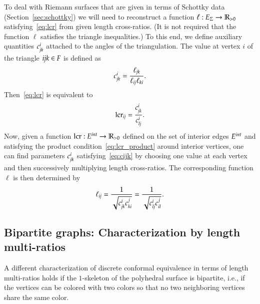 \documentclass[Thesis]{subfiles}
\begin{document}
To deal with Riemann surfaces that are given in terms of Schottky data
(Section~\ref{sec:schottky}) we will
need to reconstruct a function $\ell:E_{\Sigma}\rightarrow\mathbb R_{>0}$
satisfying~\eqref{eq:lcr} from given length cross-ratios. (It is not
required that the function $\ell$ satisfies the triangle inequalities.) To this end, we define
auxiliary quantities $c^{i}_{\it jk}$ attached to the angles of the
triangulation. The value at vertex $i$ of the triangle ${\it ijk}\in F$
is defined as
\begin{equation}
  \label{eq:cijk}
  c^{i}_{\it jk}=\frac{\ell_{\it jk}}{\ell_{\it ij}\ell_{\it ki}}.
\end{equation} 
Then~\eqref{eq:lcr} is equivalent to
\begin{equation}
\operatorname{lcr}_{\it ij}=\frac{c^i_{\it jk}}{c^i_{\it lj}}.
\end{equation}
Now, given a function $\operatorname{lcr}:E^{\mathit{int}}\rightarrow\mathbb R_{>0}$ defined on the
set of interior edges $E^{\mathit{int}}$ and satisfying the product
condition~\eqref{eq:lcr_product} around interior vertices, one can
find parameters $c^{i}_{\it jk}$ satisfying~\eqref{eq:cijk}
by choosing one value at each vertex and then successively multiplying
length cross-ratios. The corresponding function $\ell$ is then
determined by
\begin{equation}
\ell_{\it ij} = \frac{1}{\sqrt{c^i_{\it jk}c^j_{\it ki}}} = \frac{1}{\sqrt{c^i_{\it lj}c^j_{\it il}}}.
\end{equation} 

\subsection{Bipartite graphs: Characterization by length multi-ratios}
\label{sec:even_cycles}

A different characterization of discrete conformal equivalence in
terms of length multi-ratios holds if the $1$-skeleton of the
polyhedral surface is bipartite, i.e., if the vertices can be colored
with two colors so that no two neighboring vertices share the same
color. 
\end{document}

